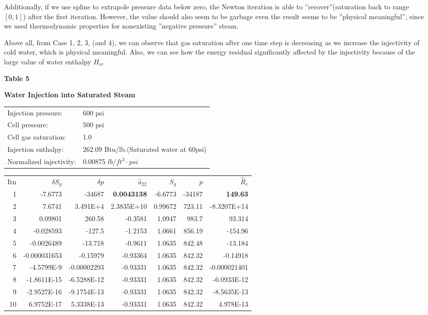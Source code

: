 \documentclass[11pt]{article}
\begin{document}
    Additionally, if we use spline to extrapole pressure data below zero, the
    Newton iteration is able to ''recover''(saturation back to range $[0,1]$) after
    the first iteration. However, the value should also seem to be garbage even
    the result seems to be ''physical meaningful'', since we used thermodynamic
    properties for nonexisting ''negative pressure'' steam.

    Above all, from Case 1, 2, 3, (and 4), we can observe that gas saturation after
    one time step is decreasing as we increase the injectivity of cold water, which
    is physical meaningful. Also, we can see how the energy residual significantly
    affected by the injectivity because of the large value of water enthalpy $H_w$.

\newpage
\centerline{\textbf{Table 5 }}
\centerline{\textbf{Water Injection into Saturated Steam}}
\vspace{20pt}

\begin{tabular}{ l l }
    Injection pressure: & 600 psi \\
    Cell pressure: & 500 psi \\
    Cell gas saturation: & 1.0 \\
    Injection enthalpy: & 262.09 Btu/lb.(Saturated water at 60psi) \\
    Normalized injectivity: & 0.00875 $lb/ft^3\cdot psi$\\
\end{tabular}
\vspace{20pt}

\begin{table}[H]
\centering
\begin{tabular}{ r r r r r r r }
    Itn & $\delta S_g$ & $\delta p$ & $\hat{a}_{22}$ &
    $S_g$ & $p$ & $\hat{R}_e$ \\
    1 & -7.6773 & -34687 & \textbf{0.0043138} & -6.6773 & -34187 & \textbf{149.63} \\
    2 & 7.6741 & 3.491E+4 & 2.3835E+10 & 0.99672 & 723.11 & -8.3207E+14 \\
    3 & 0.09801 & 260.58 & -0.3581 & 1.0947 & 983.7 & 93.314 \\
    4 & -0.028593 & -127.5 & -1.2153 & 1.0661 & 856.19 & -154.96 \\
    5 & -0.0026489 & -13.718 & -0.9611 & 1.0635 & 842.48 & -13.184 \\
    6 & -0.000031653 & -0.15979 & -0.93364 & 1.0635 & 842.32 & -0.14918 \\
    7 & -4.5799E-9 & -0.00002293 & -0.93331 & 1.0635 & 842.32 & -0.000021401 \\
    8 & -1.8611E-15 & -6.5288E-12 & -0.93331 & 1.0635 & 842.32 & -6.0933E-12 \\
    9 & -2.9527E-16 & -9.1754E-13 & -0.93331 & 1.0635 & 842.32 & -8.5635E-13 \\
    10 & 6.9752E-17 & 5.3338E-13 & -0.93331 & 1.0635 & 842.32 & 4.978E-13 \\
\end{tabular}
\end{table}
\end{document}
